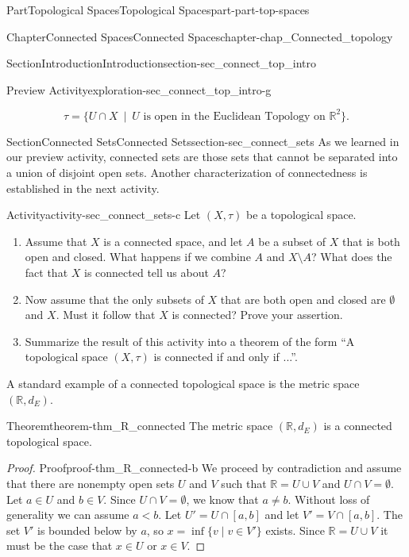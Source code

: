 \documentclass[oneside,10pt,]{book}
\numberwithin{equation}{chapter}
\newcommand{\R}{\mathbb{R}}
\newcommand{\lt}{<}
\begin{document}
\begin{partptx}{Part}{Topological Spaces}{}{Topological Spaces}{}{}{part-part-top-spaces}
\begin{chapterptx}{Chapter}{Connected Spaces}{}{Connected Spaces}{}{}{chapter-chap_Connected_topology}
\begin{sectionptx}{Section}{Introduction}{}{Introduction}{}{}{section-sec_connect_top_intro}
\begin{exploration}{Preview Activity}{}{exploration-sec_connect_top_intro-g}
\begin{enumerate}[font=\bfseries,label=(\alph*),ref=\alph*]
\begin{equation*}
\tau = \{U  \cap X \ \mid \ U \text{ is open in the Euclidean Topology on }  \R^2\}\text{.}
\end{equation*}
%
\end{enumerate}%
\end{exploration}%
\end{sectionptx}
%
%
\typeout{************************************************}
\typeout{************************************************}
%
\begin{sectionptx}{Section}{Connected Sets}{}{Connected Sets}{}{}{section-sec_connect_sets}
As we learned in our preview activity, connected sets are those sets that cannot be separated into a union of disjoint open sets. Another characterization of connectedness is established in the next activity.%
\begin{activity}{Activity}{}{activity-sec_connect_sets-c}%
Let \((X, \tau)\) be a topological space.%
\begin{enumerate}[font=\bfseries,label=(\alph*),ref=\alph*]%
\item{}Assume that \(X\) is a connected space, and let \(A\) be a subset of \(X\) that is both open and closed. What happens if we combine \(A\) and \(X \setminus A\)? What does the fact that \(X\) is connected tell us about \(A\)?%
\item{}Now assume that the only subsets of \(X\) that are both open and closed are \(\emptyset\) and \(X\). Must it follow that \(X\) is connected? Prove your assertion.%
\item{}Summarize the result of this activity into a theorem of the form ``A topological space \((X, \tau)\) is connected if and only if ...''.%
\end{enumerate}%
\end{activity}%
A standard example of a connected topological space is the metric space \((\R, d_E)\).%
\begin{theorem}{Theorem}{}{}{theorem-thm_R_connected}%
The metric space \((\R, d_E)\) is a connected topological space.%
\end{theorem}
\begin{proof}{Proof}{}{proof-thm_R_connected-b}
We proceed by contradiction and assume that there are nonempty open sets \(U\) and \(V\) such that \(\R = U \cup V\) and \(U \cap V = \emptyset\). Let \(a \in U\) and \(b \in V\). Since \(U \cap V = \emptyset\), we know that \(a \neq b\). Without loss of generality we can assume \(a \lt b\). Let \(U' = U \cap [a,b]\) and let \(V' = V \cap [a,b]\). The set \(V'\) is bounded below by \(a\), so \(x = \inf\{v \mid v \in V'\}\) exists. Since \(\R = U \cup V\) it must be the case that \(x \in U\) or \(x \in V\).%

\end{proof}
\end{sectionptx}
\end{chapterptx}
\end{partptx}
\end{document}
